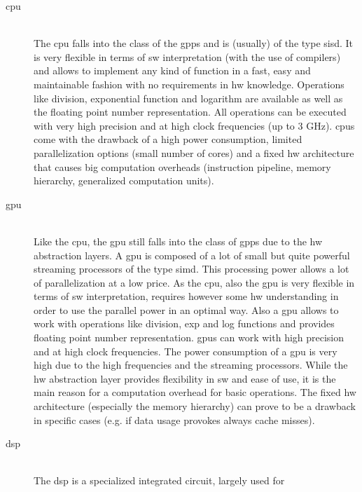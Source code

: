\documentclass[mscthesis]{usiinfthesis}
\begin{document}
\begin{description}
    \item[\acrshort{cpu}] \hfill \\
        The \acrfull{cpu} falls into the class of the \glspl{gpp} and is
        (usually) of the type \gls{sisd}. It is very flexible in terms of
        \gls{sw} interpretation (with the use of compilers) and allows to
        implement any kind of function in a fast, easy and maintainable fashion
        with no requirements in \gls{hw} knowledge. Operations like division,
        exponential function and logarithm are available as well as the
        floating point number representation. All operations can be executed
        with very high precision and at high clock frequencies (up to 3 GHz).
        \glspl{cpu} come with the drawback of a high power consumption, limited
        parallelization options (small number of cores) and a fixed \gls{hw}
        architecture that causes big computation overheads (instruction
        pipeline, memory hierarchy, generalized computation units).
    \item[\acrshort{gpu}] \hfill \\
        Like the \gls{cpu}, the \acrfull{gpu} still falls into the class of
        \glspl{gpp} due to the \gls{hw} abstraction layers. A \gls{gpu} is
        composed of a lot of small but quite powerful streaming processors of
        the type \gls{simd}. This processing power allows a lot of
        parallelization at a low price. As the \gls{cpu}, also the \gls{gpu} is
        very flexible in terms of \gls{sw} interpretation, requires however
        some \gls{hw} understanding in order to use the parallel power in an
        optimal way. Also a \gls{gpu} allows to work with operations like
        division, exp and log functions and provides floating point number
        representation. \glspl{gpu} can work with high precision and at high
        clock frequencies. The power consumption of a \gls{gpu} is very high
        due to the high frequencies and the streaming processors. While the
        \gls{hw} abstraction layer provides flexibility in \gls{sw} and ease of
        use, it is the main reason for a computation overhead for basic
        operations. The fixed \gls{hw} architecture (especially the memory
        hierarchy) can prove to be a drawback in specific cases (e.g. if data
        usage provokes always cache misses).
    \item[\acrshort{dsp}] \hfill \\
        The \acrfull{dsp} is a specialized integrated circuit, largely used for

\end{description}
\end{document}
